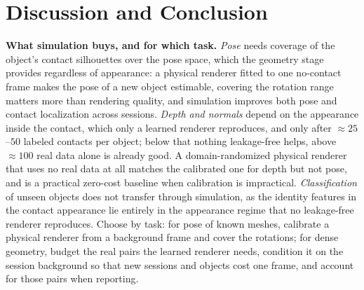 \section{Discussion and Conclusion}

\noindent\textbf{What simulation buys, and for which task.}
\emph{Pose} needs coverage of the object's contact silhouettes over the pose space, which the geometry stage provides regardless of appearance: a physical renderer fitted to one no-contact frame makes the pose of a new object estimable, covering the rotation range matters more than rendering quality, and simulation improves both pose and contact localization across sessions. \emph{Depth and normals} depend on the appearance inside the contact, which only a learned renderer reproduces, and only after $\approx\!25$--$50$ labeled contacts per object; below that nothing leakage-free helps, above $\approx\!100$ real data alone is already good. A domain-randomized physical renderer that uses no real data at all matches the calibrated one for depth but not pose, and is a practical zero-cost baseline when calibration is impractical. \emph{Classification} of unseen objects does not transfer through simulation, as the identity features in the contact appearance lie entirely in the appearance regime that no leakage-free renderer reproduces. Choose by task: for pose of known meshes, calibrate a physical renderer from a background frame and cover the rotations; for dense geometry, budget the real pairs the learned renderer needs, condition it on the session background so that new sessions and objects cost one frame, and account for those pairs when reporting.


